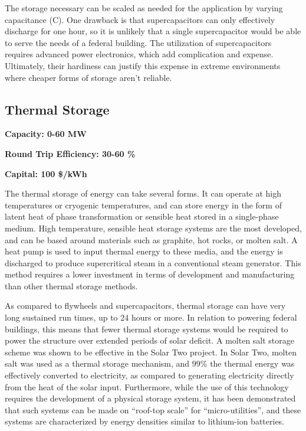 The storage necessary can be scaled as needed for the application by varying
capacitance (C). One drawback is that supercapacitors can only effectively
discharge for one hour, so it is unlikely that a single supercapacitor would be
able to serve the needs of a federal building. The utilization of
supercapacitors requires advanced power electronics, which add complication and
expense. Ultimately, their hardiness can justify this expense in extreme
environments where cheaper forms of storage aren’t reliable.


\subsection{Thermal Storage}
\textbf{Capacity: 0-60 MW}

\noindent\textbf{Round Trip Efficiency: 30-60 \%} 

\noindent\textbf{Capital: 100 \$/kWh}

The thermal storage of energy can take several forms. It can operate at high
temperatures or cryogenic temperatures, and can store energy in the form of
latent heat of phase transformation or sensible heat stored in a single-phase
medium. High temperature, sensible heat storage systems are the most developed,
and can be based around materials such as graphite, hot rocks, or molten salt.
A heat pump is used to input thermal energy to these media, and the energy is
discharged to produce supercritical steam in a conventional steam generator.
This method requires a lower investment in terms of development and
manufacturing than other thermal storage methods.
 
As compared to flywheels and supercapacitors, thermal storage can have very
long sustained run times, up to 24 hours or more. In relation to powering
federal buildings, this means that fewer thermal storage systems would be
required to power the structure over extended periods of solar deficit. A
molten salt storage scheme was shown to be effective in the Solar Two project.
In Solar Two, molten salt was used as a thermal storage mechanism, and 99\% the
thermal energy was effectively converted to electricity, as compared to
generating electricity directly from the heat of the solar input.
Furthermore, while the use of this technology requires the development of a
physical storage system, it has been demonstrated that such systems can be made
on ``roof-top scale'' for ``micro-utilities'', and these systems are characterized
by energy densities similar to lithium-ion batteries.

